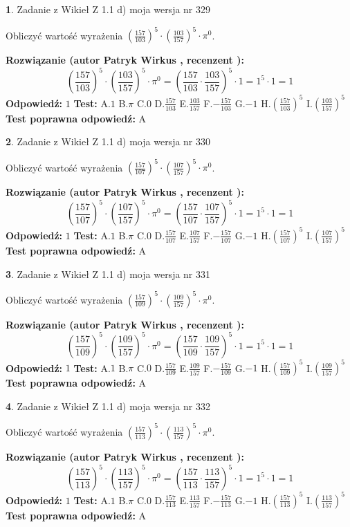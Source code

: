 \documentclass[12pt, a4paper]{article}
\theoremstyle{definition} %
\newtheorem{zad}{}
\newcommand{\zadStart}[1]{\begin{zad}#1\newline}
\newcommand{\zadStop}{\end{zad}}
\newcommand{\rozwStart}[2]{\noindent \textbf{Rozwiązanie (autor #1 , recenzent #2): }\newline}
\newcommand{\rozwStop}{\newline}
\newcommand{\odpStart}{\noindent \textbf{Odpowiedź:}\newline}
\newcommand{\odpStop}{\newline}
\newcommand{\testStart}{\noindent \textbf{Test:}\newline}
\newcommand{\testStop}{\newline}
\newcommand{\kluczStart}{\noindent \textbf{Test poprawna odpowiedź:}\newline}
\newcommand{\kluczStop}{\newline}
\begin{document}
\zadStart{Zadanie z Wikieł Z 1.1 d) moja wersja nr 329}

Obliczyć wartość wyrażenia $(\frac{157}{103})^{5} \cdot (\frac{103}{157})^{5} \cdot \pi^{0}$.
\zadStop
\rozwStart{Patryk Wirkus}{}
$$(\frac{157}{103})^{5} \cdot (\frac{103}{157})^{5} \cdot \pi^{0} = (\frac{157}{103} \cdot \frac{103}{157})^{5} \cdot 1 = 1^{5} \cdot 1 = 1$$
\rozwStop
\odpStart
$1$
\odpStop
\testStart
A.$1$ B.$\pi$ C.$0$ D.$\frac{157}{103}$ E.$\frac{103}{157}$
F.$-\frac{157}{103}$ G.$-1$
H.$(\frac{157}{103})^{5}$
I.$(\frac{103}{157})^{5}$
\testStop
\kluczStart
A
\kluczStop



\zadStart{Zadanie z Wikieł Z 1.1 d) moja wersja nr 330}

Obliczyć wartość wyrażenia $(\frac{157}{107})^{5} \cdot (\frac{107}{157})^{5} \cdot \pi^{0}$.
\zadStop
\rozwStart{Patryk Wirkus}{}
$$(\frac{157}{107})^{5} \cdot (\frac{107}{157})^{5} \cdot \pi^{0} = (\frac{157}{107} \cdot \frac{107}{157})^{5} \cdot 1 = 1^{5} \cdot 1 = 1$$
\rozwStop
\odpStart
$1$
\odpStop
\testStart
A.$1$ B.$\pi$ C.$0$ D.$\frac{157}{107}$ E.$\frac{107}{157}$
F.$-\frac{157}{107}$ G.$-1$
H.$(\frac{157}{107})^{5}$
I.$(\frac{107}{157})^{5}$
\testStop
\kluczStart
A
\kluczStop



\zadStart{Zadanie z Wikieł Z 1.1 d) moja wersja nr 331}

Obliczyć wartość wyrażenia $(\frac{157}{109})^{5} \cdot (\frac{109}{157})^{5} \cdot \pi^{0}$.
\zadStop
\rozwStart{Patryk Wirkus}{}
$$(\frac{157}{109})^{5} \cdot (\frac{109}{157})^{5} \cdot \pi^{0} = (\frac{157}{109} \cdot \frac{109}{157})^{5} \cdot 1 = 1^{5} \cdot 1 = 1$$
\rozwStop
\odpStart
$1$
\odpStop
\testStart
A.$1$ B.$\pi$ C.$0$ D.$\frac{157}{109}$ E.$\frac{109}{157}$
F.$-\frac{157}{109}$ G.$-1$
H.$(\frac{157}{109})^{5}$
I.$(\frac{109}{157})^{5}$
\testStop
\kluczStart
A
\kluczStop



\zadStart{Zadanie z Wikieł Z 1.1 d) moja wersja nr 332}

Obliczyć wartość wyrażenia $(\frac{157}{113})^{5} \cdot (\frac{113}{157})^{5} \cdot \pi^{0}$.
\zadStop
\rozwStart{Patryk Wirkus}{}
$$(\frac{157}{113})^{5} \cdot (\frac{113}{157})^{5} \cdot \pi^{0} = (\frac{157}{113} \cdot \frac{113}{157})^{5} \cdot 1 = 1^{5} \cdot 1 = 1$$
\rozwStop
\odpStart
$1$
\odpStop
\testStart
A.$1$ B.$\pi$ C.$0$ D.$\frac{157}{113}$ E.$\frac{113}{157}$
F.$-\frac{157}{113}$ G.$-1$
H.$(\frac{157}{113})^{5}$
I.$(\frac{113}{157})^{5}$
\testStop
\kluczStart
A
\kluczStop
\end{document}
